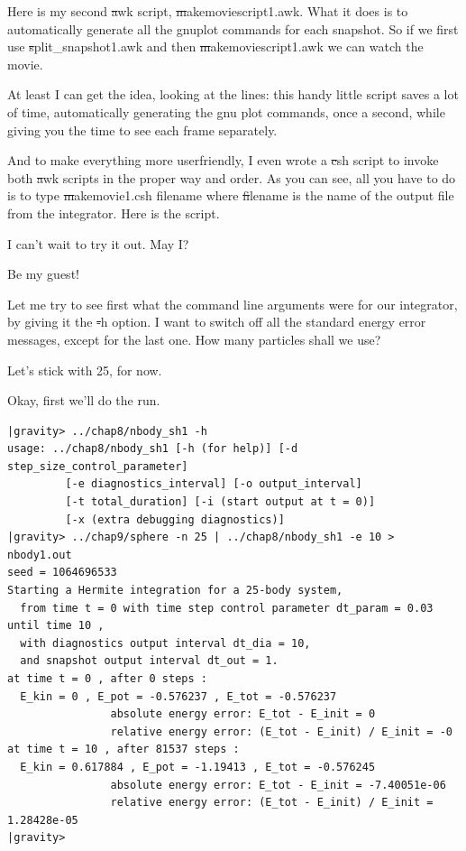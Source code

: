 \carol
Here is my second {\st awk} script, {\st makemoviescript1.awk}.
What it does is to automatically generate all the gnuplot commands for
each snapshot.  So if we first use {\st split\_snapshot1.awk} and then
{\st makemoviescript1.awk} we can watch the movie.

\cba


\abc

\bob
At least I can get the idea, looking at the lines: this handy little
script saves a lot of time, automatically generating the gnu plot
commands, once a second, while giving you the time to see each frame
separately.

\carol
And to make everything more userfriendly, I even wrote a {\st csh} script
to invoke both {\st awk} scripts in the proper way and order.  As you
can see, all you have to do is to type {\st makemovie1.csh filename}
where {\st filename} is the name of the output file from the integrator.
Here is the script.

\cba


\abc

\bob
I can't wait to try it out.  May I?

\carol
Be my guest!

\bob
Let me try to see first what the command line arguments were for our
integrator, by giving it the {\st -h} option.  I want to switch off
all the standard energy error messages, except for the last one.
How many particles shall we use?

\alice
Let's stick with 25, for now.

\bob
Okay, first we'll do the run.

\cba

\begin{small}
\begin{verbatim}
|gravity> ../chap8/nbody_sh1 -h
usage: ../chap8/nbody_sh1 [-h (for help)] [-d step_size_control_parameter]
         [-e diagnostics_interval] [-o output_interval]
         [-t total_duration] [-i (start output at t = 0)]
         [-x (extra debugging diagnostics)]
|gravity> ../chap9/sphere -n 25 | ../chap8/nbody_sh1 -e 10 > nbody1.out
seed = 1064696533
Starting a Hermite integration for a 25-body system,
  from time t = 0 with time step control parameter dt_param = 0.03  until time 10 ,
  with diagnostics output interval dt_dia = 10,
  and snapshot output interval dt_out = 1.
at time t = 0 , after 0 steps :
  E_kin = 0 , E_pot = -0.576237 , E_tot = -0.576237
                absolute energy error: E_tot - E_init = 0
                relative energy error: (E_tot - E_init) / E_init = -0
at time t = 10 , after 81537 steps :
  E_kin = 0.617884 , E_pot = -1.19413 , E_tot = -0.576245
                absolute energy error: E_tot - E_init = -7.40051e-06
                relative energy error: (E_tot - E_init) / E_init = 1.28428e-05
|gravity>
\end{verbatim}
\end{small}

